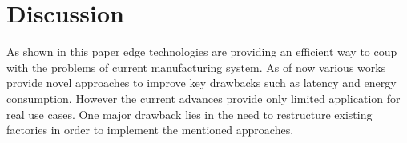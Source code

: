 \section{Discussion}\label{sec:Discussion}

As shown in this paper edge technologies are providing an efficient way to coup with the problems of current manufacturing system. As of now various works provide novel approaches to improve key drawbacks such as latency and energy consumption. However the current advances provide only limited application for real use cases. One major drawback lies in the need to restructure existing factories in order to implement the mentioned approaches.